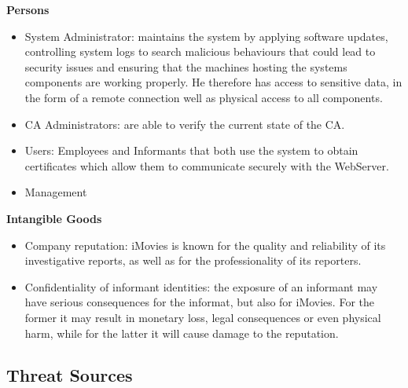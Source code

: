 \documentclass[english]{article}
\begin{document}
\noindent\textbf{Persons}
\begin{itemize}
\item System Administrator: maintains the system by applying software updates, controlling system logs to search malicious behaviours that could lead to security issues and ensuring that the machines hosting the systems components are working properly. He therefore has access to sensitive data, in the form of a remote connection well as physical access to all components.
\item CA Administrators: are able to verify the current state of the CA.
\item Users: Employees and Informants that both use the system to obtain certificates which allow them to communicate securely with the WebServer.
\item Management
\end{itemize}

\noindent\textbf{Intangible Goods}
\begin{itemize}
\item Company reputation: iMovies is known for the quality and reliability of its investigative reports, as well as for the professionality of its reporters.
\item Confidentiality of informant identities: the exposure of an informant may have serious consequences for the informat, but also for iMovies. For the former it may result in monetary loss, legal consequences or even physical harm, while for the latter it will cause damage to the reputation. 
\end{itemize}

\subsection{Threat Sources}

\end{document}

